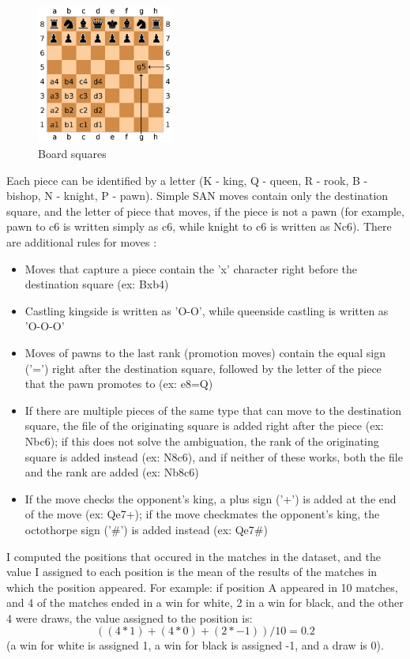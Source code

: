 \begin{figure}[h]
    \centering
    \includegraphics[width=0.4\textwidth]{figures/board-squares.png}
    \caption{Board squares}
    \label{fig:boardSquares}
\end{figure}

Each piece can be identified by a letter (K - king, Q - queen, R - rook, B - bishop, N - knight, P - pawn). Simple SAN moves contain only the destination square, and the letter of piece that moves, if the piece is not a pawn (for example, pawn to c6 is written simply as c6, while knight to c6 is written as Nc6). There are additional rules for moves \cite{edwards1994standard}:
\begin{itemize}
    \item Moves that capture a piece contain the 'x' character right before the destination square (ex: Bxb4)
    \item Castling kingside is written as 'O-O', while queenside castling is written as 'O-O-O'
    \item Moves of pawns to the last rank (promotion moves) contain the equal sign ('=') right after the destination square, followed by the letter of the piece that the pawn promotes to (ex: e8=Q)
    \item If there are multiple pieces of the same type that can move to the destination square, the file of the originating square is added right after the piece (ex: Nbc6); if this does not solve the ambiguation, the rank of the originating square is added instead (ex: N8c6), and if neither of these works, both the file and the rank are added (ex: Nb8c6)
    \item If the move checks the opponent's king, a plus sign ('+') is added at the end of the move (ex: Qe7+); if the move checkmates the opponent's king, the octothorpe sign ('\#') is added instead (ex: Qe7\#)
\end{itemize}

I computed the positions that occured in the matches in the dataset, and the value I assigned to each position is the mean of the results of the matches in which the position appeared. For example: if position A appeared in 10 matches, and 4 of the matches ended in a win for white, 2 in a win for black, and the other 4 were draws, the value assigned to the position is: \[((4*1)+(4*0)+(2*-1))/10=0.2\] (a win for white is assigned 1, a win for black is assigned -1, and a draw is 0).

